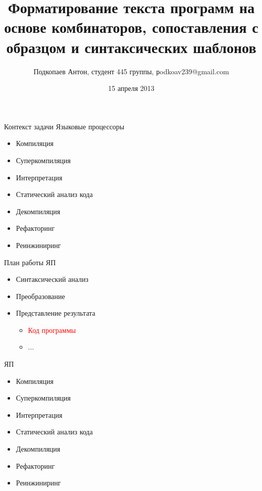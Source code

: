 \documentclass{beamer}
\begin{document}
\title
[Форматирование текста программ на основе комбинаторов, сопоставления с образцом и синтаксических шаблонов]
{Форматирование текста программ на основе комбинаторов, сопоставления с образцом и синтаксических шаблонов}
\author
[Подкопаев Антон]{Подкопаев Антон, студент 445 группы, \texttt podkoav239@gmail.com}
\date [15-04-13]{15 апреля 2013}

\begin{frame}[plain]
	\titlepage
\end{frame}

\begin{frame}{Контекст задачи}
	Языковые процессоры
	\vspace{1cm}
	\pause
	\begin{itemize}
		\item Компиляция
		\item Суперкомпиляция
		\item Интерпретация
		\item Статический анализ кода
		\item Декомпиляция
		\item Рефакторинг
		\item Реинжиниринг
	\end{itemize}
\end{frame}

\begin{frame}{План работы ЯП}
	\begin{itemize}
		\item Синтаксический анализ
		\item Преобразование
		\item Представление результата
		\pause
		\begin{itemize}
			\item \textcolor{red}{Код программы}
			\item ...
		\end{itemize}
	\end{itemize}
\end{frame}

\begin{frame}{ЯП}
	\begin{itemize}
		\item Компиляция
		\item Суперкомпиляция
		\item Интерпретация
		\item Статический анализ кода
		\item Декомпиляция
		\item Рефакторинг
		\item Реинжиниринг
	\end{itemize}
\end{frame}
\end{document}

